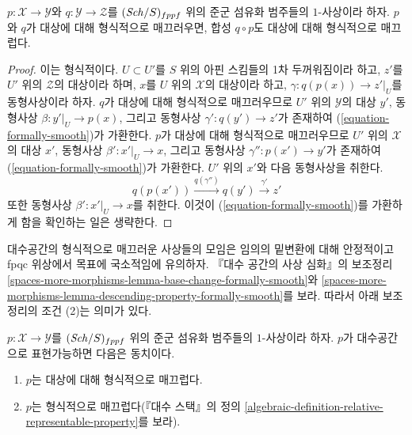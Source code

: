 \begin{lemma}
\label{lemma-composition-formally-smooth}
$p : \mathcal{X} \to \mathcal{Y}$와 $q : \mathcal{Y} \to \mathcal{Z}$를
$(\mathit{Sch}/S)_{fppf}$ 위의 준군 섬유화 범주들의 $1$-사상이라 하자.
$p$와 $q$가 대상에 대해 형식적으로 매끄러우면, 합성
$q \circ p$도 대상에 대해 형식적으로 매끄럽다.
\end{lemma}

\begin{proof}
이는 형식적이다. $U \subset U'$를 $S$ 위의 아핀 스킴들의
1차 두꺼워짐이라 하고, $z'$를 $U'$ 위의 $\mathcal{Z}$의
대상이라 하며, $x$를 $U$ 위의 $\mathcal{X}$의 대상이라 하고,
$\gamma : q(p(x)) \to z'|_U$를 동형사상이라 하자.
$q$가 대상에 대해 형식적으로 매끄러우므로 $U'$ 위의
$\mathcal{Y}$의 대상 $y'$, 동형사상
$\beta : y'|_U \to p(x)$, 그리고 동형사상
$\gamma' : q(y') \to z'$가 존재하여
(\ref{equation-formally-smooth})가 가환한다.
$p$가 대상에 대해 형식적으로 매끄러우므로 $U'$ 위의
$\mathcal{X}$의 대상 $x'$, 동형사상
$\beta' : x'|_U \to x$, 그리고 동형사상
$\gamma'' : p(x') \to y'$가 존재하여
(\ref{equation-formally-smooth})가 가환한다.
$U'$ 위의 $x'$와 다음 동형사상을 취한다.
$$
q(p(x')) \xrightarrow{q(\gamma'')} q(y') \xrightarrow{\gamma'} z'
$$
또한 동형사상 $\beta' : x'|_U \to x$를 취한다. 이것이
(\ref{equation-formally-smooth})를 가환하게 함을 확인하는 일은 생략한다.
\end{proof}

\noindent
대수공간의 형식적으로 매끄러운 사상들의 모임은 임의의 밑변환에 대해
안정적이고 fpqc 위상에서 목표에 국소적임에 유의하자.
『대수 공간의 사상 심화』의 보조정리
\ref{spaces-more-morphisms-lemma-base-change-formally-smooth}와
\ref{spaces-more-morphisms-lemma-descending-property-formally-smooth}를 보라.
따라서 아래 보조정리의 조건 (2)는 의미가 있다.

\begin{lemma}
\label{lemma-representable-by-spaces-formally-smooth}
$p : \mathcal{X} \to \mathcal{Y}$를 $(\mathit{Sch}/S)_{fppf}$ 위의
준군 섬유화 범주들의 $1$-사상이라 하자. $p$가 대수공간으로
표현가능하면 다음은 동치이다.
\begin{enumerate}
\item $p$는 대상에 대해 형식적으로 매끄럽다.
\item $p$는 형식적으로 매끄럽다(『대수 스택』의 정의
\ref{algebraic-definition-relative-representable-property}를 보라).
\end{enumerate}
\end{lemma}

